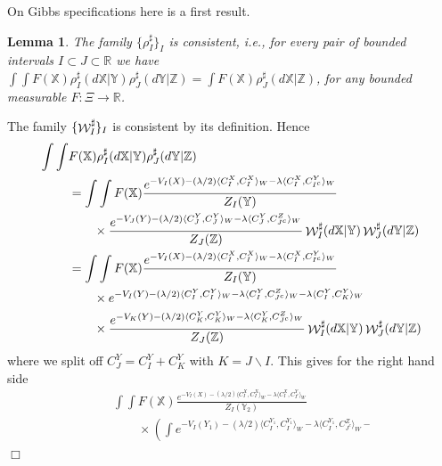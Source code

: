 \documentclass[a4paper,11pt]{article}
\newtheorem{lemma}[theorem]{Lemma}
\newenvironment{proof}[1][Proof]{{\sc #1.} }{\hfill $\Box$}
\newcommand{\R}{\mathbb{R}}
\newcommand{\ZZ}{\mathbb{Z}}
\newcommand{\W}{\mathop{\mathrm{{\cal W}}}\nolimits}
\begin{document}
On Gibbs specifications here is a first result. 
\begin{lemma}
The family $\{ \rho_I^\sharp \}_I$ is consistent, i.e., for 
every pair of bounded intervals $I \subset J \subset \R$ 
we have $\int\int F(\mathbb{X})\rho_I^\sharp(d\mathbb{X}|\mathbb{Y})
\rho_J^\sharp(d\mathbb{Y}|\ZZ) = \int  F(\mathbb{X})
\rho_J^\sharp(d\mathbb{X}|\ZZ)$, for any bounded measurable $F:
\Xi \to \R$.
\end{lemma}
\begin{proof}
The family  $\{ \W_I^\sharp \}_I$ is consistent by its definition. 
Hence
\begin{equation*}
  \begin{split}
\int \int & F(\mathbb{X})
\rho_I^\sharp(d\mathbb{X}|\mathbb{Y})
\rho_J^\sharp(d\mathbb{Y}|\ZZ) 
\\ & =
     \int \int F(\mathbb{X}) \frac{e^{-V_I(X)-(\lambda/2)
     \langle C^X_I, C^X_I \rangle_W - 
     \lambda\langle C^X_I,C^Y_{I^c}\rangle_W}}{Z_I(\mathbb{Y})}
\\ & \quad \quad \times
 \frac{e^{-V_J(Y)-(\lambda/2)\langle C^Y_J, C^Y_J \rangle_W-
 \lambda\langle C^Y_J,C^Z_{J^c} \rangle_W}}{Z_J(\ZZ)}
\W_I^\sharp(d\mathbb{X}|\mathbb{Y})\W_J^\sharp(d\mathbb{Y}|\ZZ) 
\\ &=  
     \int \int F(\mathbb{X}) \frac{e^{-V_I(X)-(\lambda/2)
     \langle C^X_I, C^X_I \rangle_W-
     \lambda\langle C^X_I,C^Y_{I^c}\rangle_W}}{Z_I(\mathbb{Y})}
\\ & \quad \quad \times
{e^{-V_I(Y)-(\lambda/2)\langle C^Y_I, C^Y_I \rangle_W
-\lambda \langle C^Y_I,C^Z_{J^c} \rangle_W -
\lambda\langle C^Y_I,C^Y_{K} \rangle_W }}{}
\\ & \quad \quad \times
 \frac{e^{-V_K(Y)-(\lambda/2)\langle C^Y_K, C^Y_K \rangle_W-
 \lambda\langle C^Y_K,C^Z_{J^c} \rangle_W}}{Z_J(\ZZ)}
\W_I^\sharp(d\mathbb{X}|\mathbb{Y})\W_J^\sharp(d\mathbb{Y}|\ZZ) 
  \end{split}
\end{equation*}
where we split off $C^Y_J = C^Y_I + C^Y_K$ with $K = J\backslash 
I$. This gives for the right hand side
\begin{equation*}
  \begin{split}
\quad  &
     \int \int F(\mathbb{X}) \frac{e^{-V_I(X)-(\lambda/2)
     \langle C^X_I,C^X_I \rangle_W-
     \lambda\langle C^X_I,C^Y_{I^c}\rangle_W}}{Z_I(\mathbb{Y}_2)}
\\ & \quad \quad \times
\left( \int {e^{-V_I(Y_1)-(\lambda/2)\langle C^{Y_1}_I,C^{Y_1}_I
\rangle_W-\lambda\langle C^{Y_1}_I,C^Z_{J^c} \rangle_W -
}}
\end{split}
\end{equation*}
\end{proof}
\end{document}
